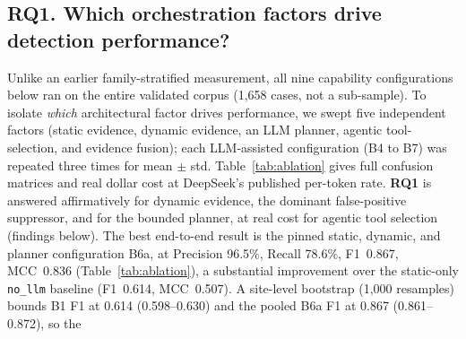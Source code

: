 \documentclass[a4paper]{llncs}
\begin{document}
\subsection{RQ1. Which orchestration factors drive detection performance?}
\label{sec:eval-ablation}
\label{sec:eval-fullcorpus}

Unlike an earlier family-stratified measurement, all nine capability
configurations below ran on the entire validated corpus (1{,}658
cases, not a sub-sample). To isolate \emph{which} architectural factor
drives performance, we swept five independent factors (static evidence,
dynamic evidence, an LLM planner, agentic tool-selection, and evidence
fusion); each LLM-assisted configuration (B4 to B7) was repeated three
times for mean $\pm$ std. Table~\ref{tab:ablation} gives full confusion
matrices and real dollar cost at DeepSeek's published per-token rate.
\textbf{RQ1} is answered affirmatively for dynamic evidence, the
dominant false-positive suppressor, and for the bounded planner, at real
cost for agentic tool selection (findings below). The best end-to-end
result is the pinned static, dynamic, and planner configuration B6a, at
Precision 96.5\%, Recall 78.6\%, F1~0.867, MCC~0.836
(Table~\ref{tab:ablation}), a substantial improvement over the
static-only \texttt{no\_llm} baseline (F1~0.614, MCC~0.507).
A site-level bootstrap (1{,}000 resamples) bounds B1 F1 at 0.614
(0.598--0.630) and the pooled B6a F1 at 0.867 (0.861--0.872), so the
\end{document}
